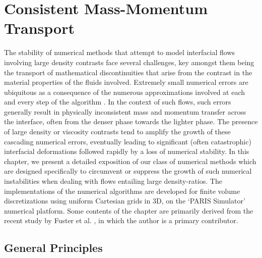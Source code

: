 \setchapterpreamble[u]{\margintoc}
\chapter{Consistent Mass-Momentum Transport}


The stability of numerical methods that attempt to model 
interfacial flows involving large density contrasts 
face several challenges, key amongst them being the transport of 
mathematical discontinuities that arise from the contrast in
the material properties of the fluids involved. 
Extremely small numerical errors are ubiquitous as a consequence of the 
numerous approximations involved at each and every step of the algorithm 
. 
In the context of such flows, such errors generally result in physically
inconsistent mass and momentum transfer across the interface, often from
the denser phase towards the lighter phase.
The presence of large density or viscosity contrasts tend to amplify
the growth of these cascading numerical errors, eventually
leading to significant (often catastrophic) interfacial deformations
followed rapidly by a loss of numerical stability. 
In this chapter, we present a detailed exposition of our class 
of numerical methods which are designed specifically to circumvent or
suppress the growth of such numerical instabilities when dealing with
flows entailing large density-ratios. 
The implementations of the numerical algorithms are developed for 
finite volume discretizations using uniform Cartesian grids in 3D, 
on the `PARIS Simulator' \cite{paris} numerical platform.      
Some contents of the chapter are primarily derived 
from the recent study by Fuster et al. , 
in which the author is a primary contributor. 


\section{General Principles}

